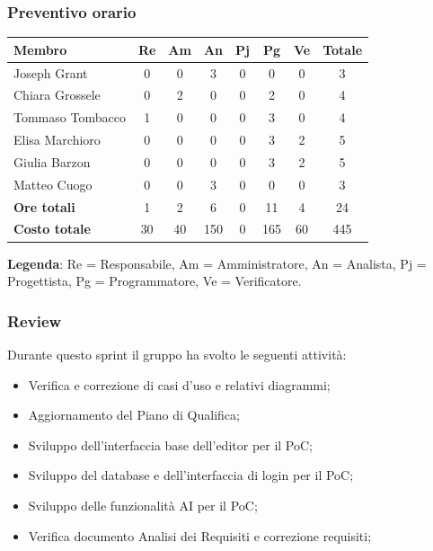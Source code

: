 \documentclass[11pt,a4paper]{article}
\begin{document}
\subsubsection{Preventivo orario}
\begin{center}
    \begin{tabular}{|l|c|c|c|c|c|c|c|}
        \hline
        \textbf{Membro} & \textbf{Re} & \textbf{Am} & \textbf{An} & \textbf{Pj} & \textbf{Pg} & \textbf{Ve} & \textbf{Totale} \\
        \hline
        Joseph Grant & 0 & 0 & 3 & 0 & 0 & 0 & 3 \\
        \hline
        Chiara Grossele & 0 & 2 & 0 & 0 & 2 & 0 & 4 \\
        \hline
        Tommaso Tombacco & 1 & 0 & 0 & 0 & 3 & 0 & 4 \\
        \hline
        Elisa Marchioro & 0 & 0 & 0 & 0 & 3 & 2 & 5 \\
        \hline
        Giulia Barzon & 0 & 0 & 0 & 0 & 3 & 2 & 5 \\
        \hline
        Matteo Cuogo & 0 & 0 & 3 & 0 & 0 & 0 & 3 \\
        \hline
        \textbf{Ore totali} & 1 & 2 & 6 & 0 & 11 & 4 & 24 \\
        \hline
        \textbf{Costo totale} & 30 & 40 & 150 & 0 & 165 & 60 & 445 \\
        \hline
    \end{tabular}
\end{center}

\noindent \textbf{Legenda}: Re = Responsabile, Am = Amministratore, An = Analista, Pj = Progettista, Pg = Programmatore, Ve = Verificatore.

\subsubsection{Review}
Durante questo sprint il gruppo ha svolto le seguenti attività:

\begin{itemize}
        \item Verifica e correzione di casi d'uso e relativi diagrammi;
        \item Aggiornamento del Piano di Qualifica;
        \item Sviluppo dell'interfaccia base dell'editor per il PoC;
        \item Sviluppo del database e dell'interfaccia di login per il PoC;
        \item Sviluppo delle funzionalità AI per il PoC;
        \item Verifica documento Analisi dei Requisiti e correzione requisiti;
    \end{itemize}
\end{document}
